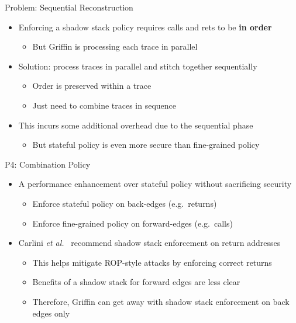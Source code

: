 \documentclass[12pt, dvipsnames, aspectratio=169]{beamer}
\makeatletter
\providecommand{\etal}{{\textit{et al\@.}}}
\makeatother
\begin{document}
\begin{frame}[c]{Problem: Sequential Reconstruction}{}
  \begin{itemize}
    \item Enforcing a shadow stack policy requires calls and rets to be {\bf in order}
    \begin{itemize}
      \item But Griffin is processing each trace in parallel
    \end{itemize}

    \vfill
    \item Solution: process traces in parallel and stitch together sequentially
    \begin{itemize}
      \item Order is preserved within a trace
      \item Just need to combine traces in sequence
    \end{itemize}

    \vfill
    \item This incurs some additional overhead due to the sequential phase
    \begin{itemize}
      \item But stateful policy is even more secure than fine-grained policy
    \end{itemize}
  \end{itemize}
\end{frame}

\begin{frame}[c]{P4: Combination Policy}{}
  \begin{itemize}
    \item A performance enhancement over stateful policy without sacrificing security
    \begin{itemize}
      \item Enforce stateful policy on back-edges (e.g.~returns)
      \item Enforce fine-grained policy on forward-edges (e.g.~calls)
    \end{itemize}

    \vfill
    \item Carlini \etal~\cite{carlini2015_cfi} recommend shadow stack enforcement on return addresses
    \begin{itemize}
      \item This helps mitigate ROP-style attacks by enforcing correct returns
      \item Benefits of a shadow stack for forward edges are less clear
      \item Therefore, Griffin can get away with shadow stack enforcement on back edges only
    \end{itemize}
  \end{itemize}
\end{frame}
\end{document}
